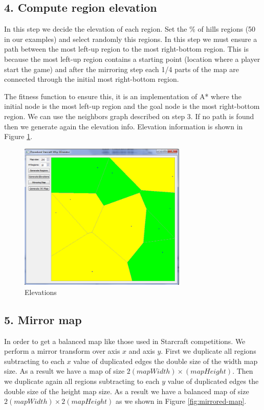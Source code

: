 \documentclass[letterpaper]{article}
\begin{document}
\subsection{4. Compute region elevation}
In this step we decide the elevation of each region. Set the \% of hills regions (50 in our examples) and select randomly this regions. In this step we must ensure a path between the most left-up region to the most right-bottom region. This is because the most left-up region contains a starting point (location where a player start the game) and after the mirroring step each 1/4 parts of the map are connected through the initial most right-bottom region.

The fitness function to ensure this, it is an implementation of A* where the initial node is the most left-up region and the goal node is the most right-bottom region. We can use the neighbors graph described on step 3. If no path is found then we generate again the elevation info. Elevation information is shown in Figure \ref{fig:elevations}.

\begin{figure}[ht]
    \centering
    \includegraphics[width=8cm]{PCG03.png}
    \caption{Elevations}
    \label{fig:elevations}
\end{figure}

\subsection{5. Mirror map}
In order to get a balanced map like those used in Starcraft competitions. We perform a mirror transform over axis $x$ and axis $y$. First we duplicate all regions subtracting to each $x$ value of duplicated edges the double size of the width map size. As a result we have a map of size $2(mapWidth) \times (mapHeight)$. Then we duplicate again all regions subtracting to each $y$ value of duplicated edges the double size of the height map size. As a result we have a balanced map of size $2(mapWidth)  \times 2(mapHeight)$ as we shown in Figure \ref{fig:mirrored-map}.
\end{document}

